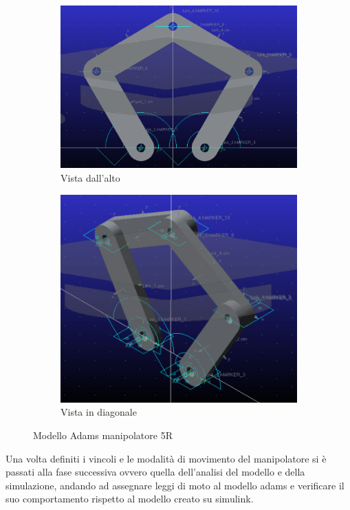 \begin{figure}[!ht]
	\begin{subfigure}{.5\textwidth}
		\centering
		\includegraphics[width=.9\linewidth]{Immagini/Dinamica/adams1.png}  
		\caption{Vista dall'alto}
		\label{fig:sub-adams1}
	\end{subfigure}
	\begin{subfigure}{.5\textwidth}
		\centering
		\includegraphics[width=.8\linewidth]{Immagini/Dinamica/adams2.png}  
		\caption{Vista in diagonale}
		\label{fig:sub-adams2}
	\end{subfigure}
	\caption{Modello Adams manipolatore 5R}
\end{figure}
Una volta definiti i vincoli e le modalità di movimento del manipolatore si è passati alla fase successiva ovvero quella dell'analisi del modello e della simulazione, andando ad assegnare leggi di moto al modello adams e verificare il suo comportamento rispetto al modello creato su simulink.
